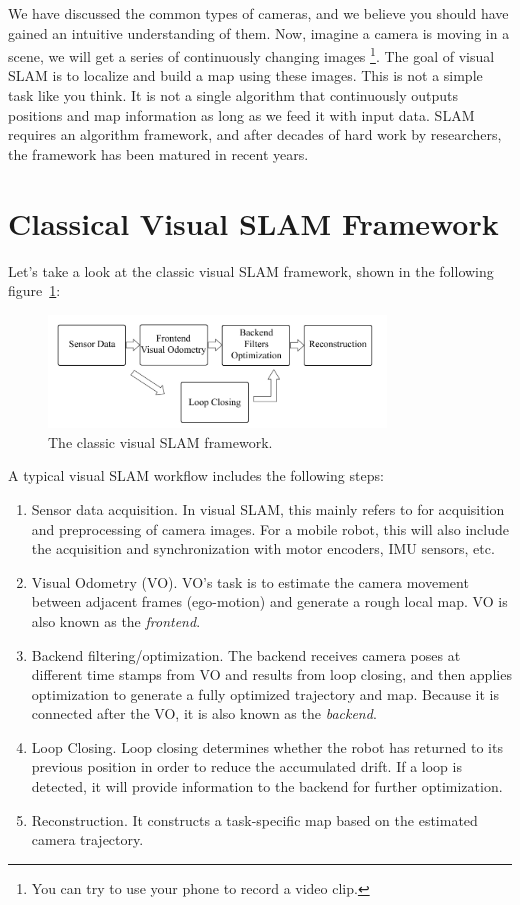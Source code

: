 We have discussed the common types of cameras, and we believe you should have gained an intuitive understanding of them. Now, imagine a camera is moving in a scene, we will get a series of continuously changing images \footnote{You can try to use your phone to record a video clip.}. The goal of visual SLAM is to localize and build a map using these images. This is not a simple task like you think. It is not a single algorithm that continuously outputs positions and map information as long as we feed it with input data. SLAM requires an algorithm framework, and after decades of hard work by researchers, the framework has been matured in recent years.

\section{Classical Visual SLAM Framework}

Let's take a look at the classic visual SLAM framework, shown in the following figure~\ref{fig:workflow}:

\begin{figure}
    \centering
    \includegraphics[width=0.8\textwidth]{./resources/whatIsSLAM/workflow.pdf}
    \caption{The classic visual SLAM framework.}
    \label{fig:workflow}
\end{figure}

A typical visual SLAM workflow  includes the following steps:
\begin{enumerate}
\item{Sensor data acquisition}. In visual SLAM, this mainly refers to for acquisition and preprocessing of camera images. For a mobile robot, this will also include the acquisition and synchronization with motor encoders, IMU sensors, etc.
\item{Visual Odometry (VO)}. VO's task is to estimate the camera movement between adjacent frames (ego-motion) and generate a rough local map. VO is also known as the \emph{frontend}.
\item{Backend filtering/optimization}. The backend receives camera poses at different time stamps from VO and results from loop closing, and then applies optimization to generate a fully optimized trajectory and map. Because it is connected after the VO, it is also known as the \textit{backend}.
\item {Loop Closing}. Loop closing determines whether the robot has returned to its previous position in order to reduce the accumulated drift. If a loop is detected, it will provide information to the backend for further optimization.
\item {Reconstruction}. It constructs a task-specific map based on the estimated camera trajectory.
\end{enumerate}

